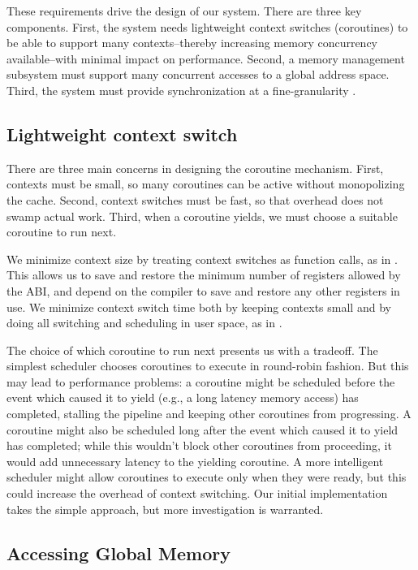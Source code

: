 \documentclass{acm_proc_article-sp}
\begin{document}
These requirements drive the design of our system. There are three key
components. First, the system needs lightweight context switches (coroutines) to be able to support many contexts--thereby increasing memory concurrency available--with minimal impact on performance. Second, a memory management subsystem must support many concurrent accesses to a global address space. Third, the system must provide synchronization at a fine-granularity .

\subsection{Lightweight context switch}

There are three main concerns in designing the coroutine
mechanism. First, contexts must be small, so many coroutines can be
active without monopolizing the cache. Second, context switches must
be fast, so that overhead does not swamp actual work. Third, when a
coroutine yields, we must choose a suitable coroutine to run next.

We minimize context size by treating context switches as function
calls, as in \cite{charm}. This allows us to save and restore the
minimum number of registers allowed by the ABI, and depend on the
compiler to save and restore any other registers in use. We minimize
context switch time both by keeping contexts small and by doing all
switching and scheduling in user space, as in .

The choice of which coroutine to run next presents us with a
tradeoff. The simplest scheduler chooses coroutines to execute in
round-robin fashion. But this may lead to performance problems: a
coroutine might be scheduled before the event which caused it to yield (e.g., a long latency memory access)
has completed, stalling the pipeline and keeping other coroutines from
progressing. A coroutine might also be scheduled long after the event
which caused it to yield has completed; while this wouldn't block
other coroutines from proceeding, it would add unnecessary latency to
the yielding coroutine. A more intelligent scheduler might allow
coroutines to execute only when they were ready, but this could
increase the overhead of context switching. Our initial implementation
takes the simple approach, but more investigation is warranted.

\subsection{Accessing Global Memory}
\end{document}
